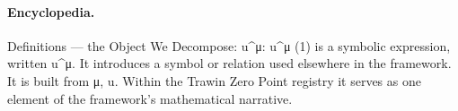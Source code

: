 \paragraph{Encyclopedia.}
Definitions — the Object We Decompose: u\textasciicircum{}μ: u\textasciicircum{}μ (1) is a symbolic expression, written u\textasciicircum{}μ. It introduces a symbol or relation used elsewhere in the framework. It is built from μ, u. Within the Trawin Zero Point registry it serves as one element of the framework's mathematical narrative.
